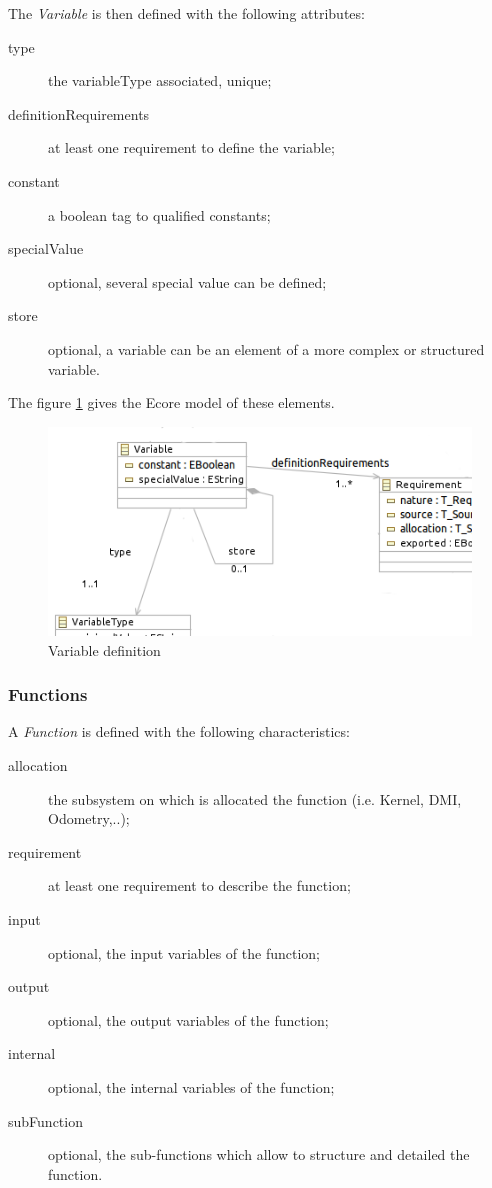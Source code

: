 The \textit{Variable} is then defined with the following attributes:
\begin{description}
\item[type] the variableType associated, unique;
\item[definitionRequirements] at least one requirement to  define the variable;
\item[constant] a boolean tag to qualified constants;
\item[specialValue] optional, several special value can be defined;
\item[store] optional, a variable can be an element of a more complex or structured variable.
\end{description}

The figure \ref{fig:variable} gives the Ecore model of these elements.


\begin{figure}[ht]
  \centering
  \includegraphics{DataModel/Variable3.png}
  \caption{Variable definition}
  \label{fig:variable}
\end{figure}



\subsubsection{Functions}

A \textit{Function} is defined with the following characteristics:
\begin{description}
\item[allocation] the subsystem  on which is allocated the function (i.e. Kernel, DMI, Odometry,..);
\item[requirement] at least one requirement to describe the function;
\item[input] optional, the input variables of the function;
\item[output] optional, the output variables of the function;
\item[internal] optional, the internal variables of the function;
\item[subFunction] optional, the sub-functions which allow to structure and  detailed the function.
\end{description}

